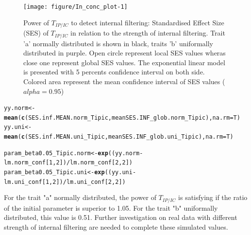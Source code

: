 \documentclass[12pt]{article}\usepackage[]{graphicx}\usepackage[]{color}
\makeatletter
\newcommand{\hlnum}[1]{\textcolor[rgb]{0.686,0.059,0.569}{#1}}%
\newcommand{\hlopt}[1]{\textcolor[rgb]{0,0,0}{#1}}%
\newcommand{\hlstd}[1]{\textcolor[rgb]{0.345,0.345,0.345}{#1}}%
\newcommand{\hlkwb}[1]{\textcolor[rgb]{0.69,0.353,0.396}{#1}}%
\newcommand{\hlkwc}[1]{\textcolor[rgb]{0.333,0.667,0.333}{#1}}%
\newcommand{\hlkwd}[1]{\textcolor[rgb]{0.737,0.353,0.396}{\textbf{#1}}}%
\newenvironment{kframe}{%
 \def\at@end@of@kframe{}%
 \ifinner\ifhmode%
  \def\at@end@of@kframe{\end{minipage}}%
  \begin{minipage}{\columnwidth}%
 \fi\fi%
 \def\FrameCommand##1{\hskip\@totalleftmargin \hskip-\fboxsep
 \colorbox{shadecolor}{##1}\hskip-\fboxsep
     \hskip-\linewidth \hskip-\@totalleftmargin \hskip\columnwidth}%
 \MakeFramed {\advance\hsize-\width
   \@totalleftmargin\z@ \linewidth\hsize
   \@setminipage}}%
 {\par\unskip\endMakeFramed%
 \at@end@of@kframe}
\newenvironment{knitrout}{}{} %
\makeatother
\begin{document}
\begin{knitrout}
\begin{figure}
{\centering \texttt{[image: figure/In\_conc\_plot-1]} 

}

\caption[Power of $T_{IP/IC}$ to detect internal filtering]{Power of $T_{IP/IC}$ to detect internal filtering: Standardised Effect Size (SES) of $T_{IP/IC}$ in relation to the strength of internal filtering. Trait 'a' normally distributed is shown in black, traits 'b' uniformally distributed in purple. Open circle represent local SES values wheras close one represent global SES values. The exponential linear model is presented with 5 percents confidence interval on both side. Colored area represent the mean confidence interval of SES values ($alpha = 0.95$)\label{fig:In_conc_plot}}
\end{figure}


\end{knitrout}

\begin{knitrout}\small
{}\color{fgcolor}\begin{kframe}
\begin{alltt}
\hlstd{yy.norm} \hlkwb{<-} \hlkwd{mean}\hlstd{(}\hlkwd{c}\hlstd{(SES.inf.MEAN.norm_Tipic, meanSES.INF_glob.norm_Tipic),} \hlkwc{na.rm} \hlstd{= T)}
\hlstd{yy.uni} \hlkwb{<-} \hlkwd{mean}\hlstd{(}\hlkwd{c}\hlstd{(SES.inf.MEAN.uni_Tipic, meanSES.INF_glob.uni_Tipic),} \hlkwc{na.rm} \hlstd{= T)}

\hlstd{param_beta0.05_Tipic.norm} \hlkwb{<-} \hlkwd{exp}\hlstd{((yy.norm} \hlopt{-} \hlstd{lm.norm_conf [}\hlnum{1}\hlstd{,} \hlnum{2}\hlstd{])} \hlopt{/} \hlstd{lm.norm_conf [}\hlnum{2}\hlstd{,} \hlnum{2}\hlstd{])}
\hlstd{param_beta0.05_Tipic.uni} \hlkwb{<-} \hlkwd{exp}\hlstd{((yy.uni} \hlopt{-} \hlstd{lm.uni_conf [}\hlnum{1}\hlstd{,} \hlnum{2}\hlstd{])} \hlopt{/} \hlstd{lm.uni_conf [}\hlnum{2}\hlstd{,} \hlnum{2}\hlstd{])}
\end{alltt}
\end{kframe}
\end{knitrout}


For the trait "a" normally distributed, the power of $T_{IP/IC}$ is satisfying if the ratio of the initial parameter is superior to
 1.05. For the trait "b" uniformally distributed, this value is 0.51. 
 Further investigation on real data with different strength of internal filtering are needed to complete these simulated values.

 
\end{document}
